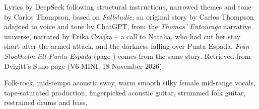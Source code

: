 
\label{sec:morkret-i-punta-espada}
\begin{notes}
Lyrics by DeepSeek following structural instructions, narrowed themes and tone by Carlos Thompson, based on \emph{Fallstudie}, an original story by Carlos Thompson adapted to voice and tone by ChatGPT, from the \emph{Thomas' Entourage} narrative universe, narrated by Erika Czajka -- a call to Natalia, who had cut her stay short after the armed attack, and the darkness falling over Punta Espada. \emph{Från Stockholm till Punta Espada} (page \pageref{sec:fran-stockholm-till-punta-espada}) comes from the same story. Retrieved from Dvigitt's Suno page (V6-MINI, 18 November 2026).
\end{notes}
\begin{style}
Folk-rock, mid-tempo acoustic sway, warm smooth silky female mid-range vocals, tape-saturated production, fingerpicked acoustic guitar, strummed folk guitar, restrained drums and bass.
\end{style}
